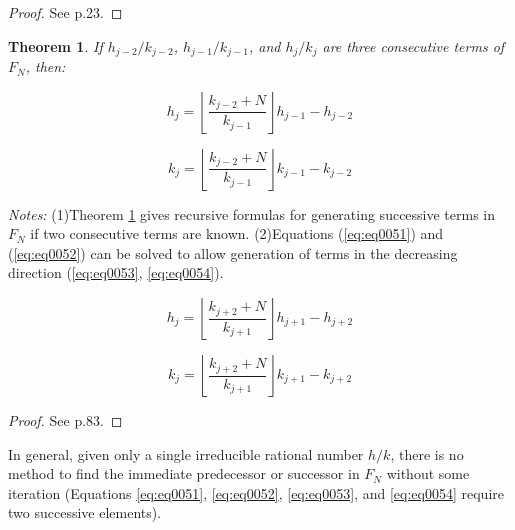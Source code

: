 \documentclass{esub2acm}
\newtheorem{mytheorem}{Theorem}
\begin{document}
\begin{proof}
See \cite{HardyAndWrightClassic} p.23.
\end{proof}

\begin{mytheorem}
\label{thm:thm04}
If $h_{j-2}/k_{j-2}$, $h_{j-1}/k_{j-1}$, and $h_{j}/k_{j}$
are three consecutive terms of $F_{N}$, then:
\end{mytheorem}

\begin{equation}
\label{eq:eq0051}
h_{j}  = \left\lfloor {\frac{{k_{j-2}
     + N}}{{k_{j - 1} }}} \right\rfloor h_{j - 1}  - h_{j-2}
\end{equation}

\begin{equation}
\label{eq:eq0052}
k_{j}  = \left\lfloor {\frac{{k_{j-2}  + N}}{{k_{j
     - 1} }}} \right\rfloor k_{j - 1}  - k_{j-2}
\end{equation}

\emph{Notes:} (1)Theorem \ref{thm:thm04} gives
recursive formulas for
generating successive terms in $F_N$
if two consecutive terms are known.
(2)Equations (\ref{eq:eq0051}) and
(\ref{eq:eq0052}) can be solved to
allow generation of terms in the decreasing direction
(\ref{eq:eq0053}, \ref{eq:eq0054}).

\begin{equation}
\label{eq:eq0053}
h_j  = \left\lfloor {\frac{{k_{j + 2}  + N}}{{k_{j + 1} }}} \right\rfloor h_{j + 1}  - h_{j + 2}
\end{equation}

\begin{equation}
\label{eq:eq0054}
k_j  = \left\lfloor {\frac{{k_{j + 2}  + N}}{{k_{j + 1} }}} \right\rfloor k_{j + 1}  - k_{j + 2}
\end{equation}

\begin{proof}
See \cite{SchroederClassic} p.83.
\end{proof}

In general, given only a single irreducible rational number $h/k$,
there is no method to find the immediate
predecessor or successor in $F_N$ without some
iteration (Equations \ref{eq:eq0051},
\ref{eq:eq0052},
\ref{eq:eq0053}, and \ref{eq:eq0054} require
two successive elements).

\end{document}
